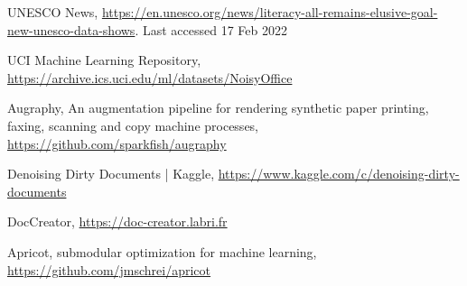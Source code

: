 \documentclass[runningheads]{llncs}
\begin{document}


\begin{thebibliography}{8}

  UNESCO News, \url{https://en.unesco.org/news/literacy-all-remains-elusive-goal-new-unesco-data-shows}. Last accessed 17 Feb 2022

  UCI Machine Learning Repository, \url{https://archive.ics.uci.edu/ml/datasets/NoisyOffice}

  Augraphy, An augmentation pipeline for rendering synthetic paper printing, faxing, scanning and copy machine processes, \url{https://github.com/sparkfish/augraphy}

  Denoising Dirty Documents | Kaggle, \url{https://www.kaggle.com/c/denoising-dirty-documents}

  DocCreator, \url{https://doc-creator.labri.fr}

  Apricot, submodular optimization for machine learning, \url{https://github.com/jmschrei/apricot}

\end{thebibliography}
\end{document}
